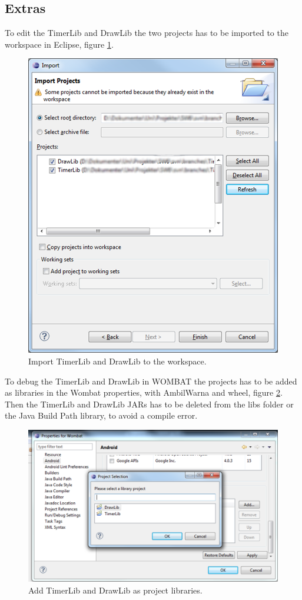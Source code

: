 \subsection*{Extras}
To edit the TimerLib and DrawLib the two projects has to be imported to the workspace in Eclipse, figure \ref{fig:import2}.

\begin{figure}[H]
	\centering
		\includegraphics[scale=0.22]{Images/how_to_wombat/import2.png}
	\caption{Import TimerLib and DrawLib to the workspace.}
	\label{fig:import2}
\end{figure}

To debug the TimerLib and DrawLib in WOMBAT the projects has to be added as libraries in the Wombat properties, with AmbilWarna and wheel, figure \ref{fig:add_timer_draw_lib}.
Then the TimerLib and DrawLib JARs has to be deleted from the libs folder or the Java Build Path library, to avoid a compile error.

\begin{figure}[H]
	\centering
		\includegraphics[scale=0.2]{Images/how_to_wombat/add_timer_draw_lib.png}
	\caption{Add TimerLib and DrawLib as project libraries.}
	\label{fig:add_timer_draw_lib}
\end{figure}